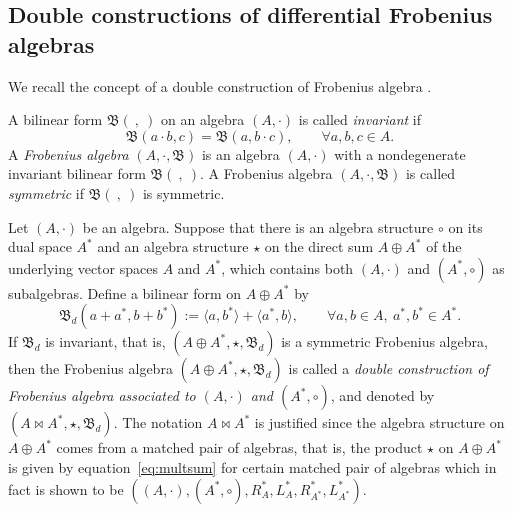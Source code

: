 \documentclass[10pt,a4paper]{amsart}
\numberwithin{equation}{section}
\begin{document}
\subsection{Double constructions of differential Frobenius algebras}\label{subsec:double}
We recall the concept of a double construction of Frobenius algebra \cite{BaiDouble}.

\begin{Definition}\label{def:invariant_bilinear_form}
 A bilinear form $\mathfrak{B}(\ ,\ )$ on an algebra $(A, \cdot)$ is called \textit{invariant} if
 \begin{equation*}
 \mathfrak{B}(a \cdot b, c) = \mathfrak{B}(a, b \cdot c), \qquad
 \forall a, b, c \in A.
 \end{equation*}
 A \textit{Frobenius algebra} $(A, \cdot, \mathfrak{B})$ is an algebra $(A, \cdot)$ with a nondegenerate invariant bilinear form $\mathfrak{B}(\ , \ )$.
 A Frobenius algebra $(A, \cdot, \mathfrak{B})$ is called \textit{symmetric} if $\mathfrak{B}(\ , \ )$ is symmetric.
\end{Definition}

Let $(A, \cdot)$ be an algebra.
Suppose that there is an algebra structure $\circ$ on its dual space $A^*$ and an algebra structure $\star$ on the direct sum $A \oplus A^*$ of the underlying vector spaces $A$ and $A^*$, which contains both $(A, \cdot)$ and $(A^*, \circ)$ as subalgebras.
Define a bilinear form on $A \oplus A^*$ by
\begin{equation}
 \mathfrak{B}_d(a + a^*, b + b^*) := \langle a, b^* \rangle + \langle a^*, b \rangle , \qquad
 \forall a, b \in A, \ a^*, b^* \in A^*. \label{eq:bilform}
\end{equation}
If $\mathfrak{B}_d$ is invariant, that is,
$(A \oplus A^*, \star, \mathfrak{B}_d)$ is a symmetric Frobenius algebra,
then the Frobenius algebra $(A \oplus A^*, \star, \mathfrak{B}_d)$ is called a
\textit{double construction of Frobenius algebra associated to $(A, \cdot)$ and $(A^*, \circ)$},
and denoted by $(A \bowtie A^*, \star , \mathfrak{B}_d)$.
The notation $A \bowtie A^*$ is justified since the algebra structure on $A \oplus A^*$ comes from a matched pair of algebras, that is, the product $\star$ on $A \oplus A^*$ is given by equation~\eqref{eq:multsum} for certain matched pair of algebras which in fact is shown to be $((A, \cdot), (A^*, \circ), R^*_A, L^*_A, R^*_{A^*}, L^*_{A^*})$.
\end{document}
